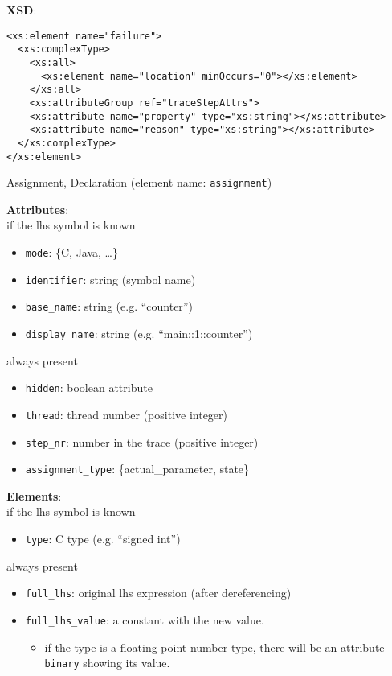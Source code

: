 \documentclass[12pt]{article}
\begin{document}
\noindent\textbf{XSD}:
\begin{verbatim}
<xs:element name="failure">
  <xs:complexType>
    <xs:all>
      <xs:element name="location" minOccurs="0"></xs:element>
    </xs:all>
    <xs:attributeGroup ref="traceStepAttrs">
    <xs:attribute name="property" type="xs:string"></xs:attribute>
    <xs:attribute name="reason" type="xs:string"></xs:attribute>
  </xs:complexType>
</xs:element>
\end{verbatim}


\begin{center}
{\Large Assignment, Declaration} (element name: \texttt{assignment})
\end{center}

\noindent\textbf{Attributes}:\\
if the lhs symbol is known
\begin{itemize}
\item \texttt{mode}: \{C, Java, …\}
\item \texttt{identifier}: string (symbol name)
\item \texttt{base\_name}: string (e.g. ``counter'')
\item \texttt{display\_name}: string (e.g. ``main::1::counter'')
\end{itemize}
always present
\begin{itemize}
\item \texttt{hidden}: boolean attribute
\item \texttt{thread}: thread number (positive integer)
\item \texttt{step\_nr}: number in the trace (positive integer)
\item \texttt{assignment\_type}: \{actual\_parameter, state\}
\end{itemize}

\noindent\textbf{Elements}:\\
if the lhs symbol is known
\begin{itemize}
\item \texttt{type}: C type (e.g. ``signed int'')
\end{itemize}
always present
\begin{itemize}
\item \texttt{full\_lhs}: original lhs expression (after dereferencing)
\item \texttt{full\_lhs\_value}: a constant with the new value.
  \begin{itemize}
    \item if the type is a floating point number type, there will be an attribute
    \texttt{binary} showing its value.
  \end{itemize}

\end{itemize}
\end{document}
